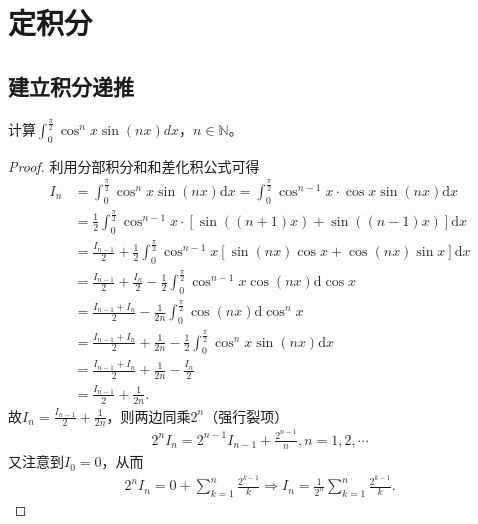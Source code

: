 \documentclass[../../main.tex]{subfiles}
\begin{document}
\section{定积分}

\subsection{建立积分递推}

\begin{example}
计算\(\int_{0}^{\frac{\pi}{2}} \cos^{n}x\sin(nx)dx\)，\(n \in \mathbb{N}\)。 
\end{example}
\begin{proof}
利用分部积分和和差化积公式可得
\begin{align*}
I_n&=\int_0^{\frac{\pi}{2}}\cos ^nx\sin(nx) \mathrm{d}x=\int_0^{\frac{\pi}{2}}\cos ^{n - 1}x\cdot\cos x\sin(nx) \mathrm{d}x\\
&=\frac{1}{2}\int_0^{\frac{\pi}{2}}\cos ^{n - 1}x\cdot[\sin((n + 1)x)+\sin((n - 1)x)] \mathrm{d}x\\
&=\frac{I_{n - 1}}{2}+\frac{1}{2}\int_0^{\frac{\pi}{2}}\cos ^{n - 1}x[\sin(nx)\cos x+\cos(nx)\sin x] \mathrm{d}x\\
&=\frac{I_{n - 1}}{2}+\frac{I_n}{2}-\frac{1}{2}\int_0^{\frac{\pi}{2}}\cos ^{n - 1}x\cos(nx) \mathrm{d}\cos x\\
&=\frac{I_{n - 1}+I_n}{2}-\frac{1}{2n}\int_0^{\frac{\pi}{2}}\cos(nx) \mathrm{d}\cos ^nx\\
&=\frac{I_{n - 1}+I_n}{2}+\frac{1}{2n}-\frac{1}{2}\int_0^{\frac{\pi}{2}}\cos ^nx\sin(nx) \mathrm{d}x\\
&=\frac{I_{n - 1}+I_n}{2}+\frac{1}{2n}-\frac{I_n}{2}\\
&=\frac{I_{n - 1}}{2}+\frac{1}{2n}.
\end{align*}
故\(I_n=\frac{I_{n - 1}}{2}+\frac{1}{2n}\)，则两边同乘\(2^n\)（强行裂项）
\begin{align*}
2^nI_n = 2^{n - 1}I_{n - 1}+\frac{2^{n - 1}}{n},n = 1,2,\cdots
\end{align*}
又注意到\(I_0 = 0\)，从而
\begin{align*}
2^nI_n = 0+\sum_{k = 1}^n\frac{2^{k - 1}}{k}\Rightarrow I_n=\frac{1}{2^n}\sum_{k = 1}^n\frac{2^{k - 1}}{k}.
\end{align*}
\end{proof}
\end{document}
